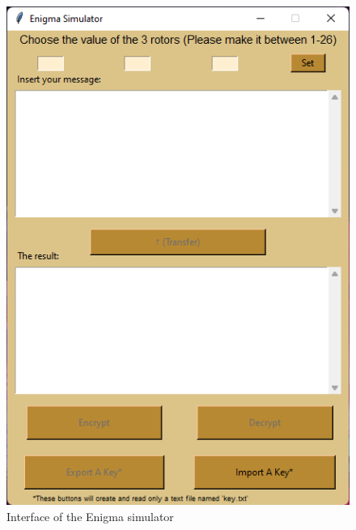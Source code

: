 \documentclass[conference,compsoc]{IEEEtran}
\begin{document}
\begin{figure}[h!]
    \centering
    \includegraphics[scale = 0.8]{interface.png}
    \caption{Interface of the Enigma simulator}
    \label{fig:infac}
\end{figure}
\end{document}
